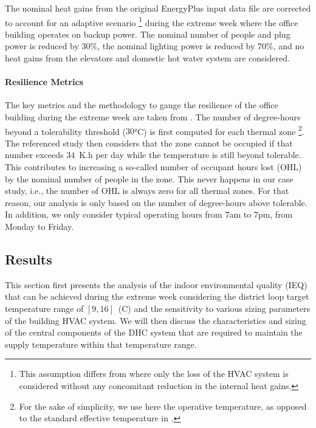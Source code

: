 The nominal heat gains from the original EnergyPlus input data file are corrected to account for an adaptive scenario%
\footnote{This assumption differs from \cite{Mathew2021} where only the loss of the HVAC system is considered without any concomitant reduction in the internal heat gains.}
during the extreme week where the office building operates on backup power. The nominal number of people and plug power is reduced by $30\%$, the nominal lighting power is reduced by $70\%$, and no heat gains from the elevators and domestic hot water system are considered.

\paragraph{Resilience Metrics} \label{par:metrics}

The key metrics and the methodology to gauge the resilience of the office building during the extreme week are taken from \cite{Mathew2021}.
The number of degree-hours beyond a tolerability threshold ($30$°C) is first computed for each thermal zone%
\footnote{For the sake of simplicity, we use here the operative temperature, as opposed to the standard effective temperature in \cite{Mathew2021}.}.
The referenced study then considers that the zone cannot be occupied if that number exceeds $34$~K.h per day while the temperature is still beyond tolerable. This contributes to increasing a so-called number of occupant hours lost (OHL) by the nominal number of people in the zone.
This never happens in our case study, i.e., the number of OHL is always zero for all thermal zones.
For that reason, our analysis is only based on the number of degree-hours above tolerable. In addition, we only consider typical operating hours from $7$am to $7$pm, from Monday to Friday.


\subsection{Results} \label{sec:results}

This section first presents the analysis of the indoor environmental quality (IEQ) that can be achieved during the extreme week considering the district loop target temperature range of $[9, 16]$~(C) and the sensitivity to various sizing parameters of the building HVAC system.
We will then discuss the characteristics and sizing of the central components of the DHC system that are required to maintain the supply temperature within that temperature range.


